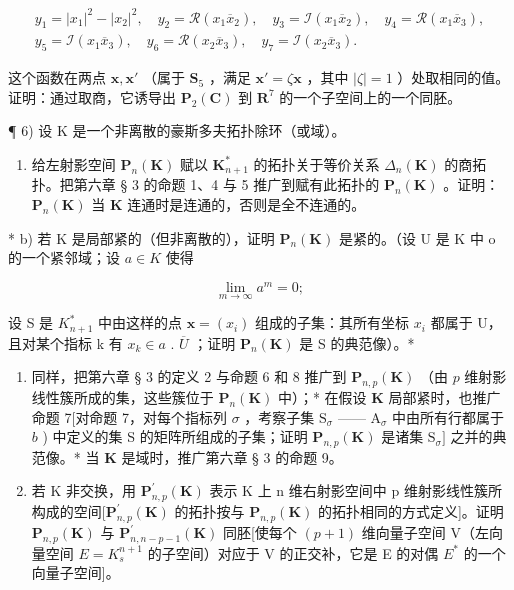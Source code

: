 \[
\begin{array}{c} y _ {1} = | x _ {1} | ^ {2} - | x _ {2} | ^ {2}, \quad y _ {2} = \mathcal {R} (x _ {1} \overline {{x}} _ {2}), \quad y _ {3} = \mathcal {I} (x _ {1} \overline {{x}} _ {2}), \quad y _ {4} = \mathcal {R} (x _ {1} \overline {{x}} _ {3}), \\ y _ {5} = \mathcal {I} (x _ {1} \overline {{x}} _ {3}), \quad y _ {6} = \mathcal {R} (x _ {2} \overline {{x}} _ {3}), \quad y _ {7} = \mathcal {I} (x _ {2} \overline {{x}} _ {3}). \end{array}
\]

这个函数在两点 \(\pmb{x}, \pmb{x}'\) （属于 \(\mathbf{S}_5\) ，满足 \(\pmb{x}' = \zeta \pmb{x}\) ，其中 \(|\zeta| = 1\) ）处取相同的值。证明：通过取商，它诱导出 \(\mathbf{P}_2(\mathbf{C})\) 到 \(\mathbf{R}^7\) 的一个子空间上的一个同胚。

¶ 6) 设 K 是一个非离散的豪斯多夫拓扑除环（或域）。

\begin{enumerate}
\def\labelenumi{\alph{enumi})}
\tightlist
\item
  给左射影空间 \(\mathbf{P}_n(\mathbf{K})\) 赋以 \(\mathbf{K}_{n+1}^*\) 的拓扑关于等价关系 \(\Delta_n(\mathbf{K})\) 的商拓扑。把第六章 § 3 的命题 1、4 与 5 推广到赋有此拓扑的 \(\mathbf{P}_n(\mathbf{K})\) 。证明：\(\mathbf{P}_n(\mathbf{K})\) 当 \(\mathbf{K}\) 连通时是连通的，否则是全不连通的。
\end{enumerate}

* b) 若 K 是局部紧的（但非离散的），证明 \(\mathbf{P}_{n}(\mathbf{K})\) 是紧的。（设 U 是 K 中 o 的一个紧邻域；设 \(a \in K\) 使得

\[
\lim _ {m \rightarrow \infty} a ^ {m} = 0;
\]

设 S 是 \(K_{n+1}^{*}\) 中由这样的点 \(\boldsymbol{x} = (x_{i})\) 组成的子集：其所有坐标 \(x_{i}\) 都属于 U，且对某个指标 k 有 \(x_{k} \in a\) . \(\overline{U}\) ；证明 \(\mathbf{P}_{n}(\mathbf{K})\) 是 S 的典范像）。*

\begin{enumerate}
\def\labelenumi{\alph{enumi})}
\setcounter{enumi}{2}
\item
  同样，把第六章 § 3 的定义 2 与命题 6 和 8 推广到 \(\mathbf{P}_{n,p}(\mathbf{K})\) （由 \(p\) 维射影线性簇所成的集，这些簇位于 \(\mathbf{P}_n(\mathbf{K})\) 中）；* 在假设 \(\mathbf{K}\) 局部紧时，也推广命题 7{[}对命题 7，对每个指标列 \(\sigma\) ，考察子集 \(\mathrm{S}_{\sigma}\) —— \(\mathrm{A}_{\sigma}\) 中由所有行都属于 \(b\) ) 中定义的集 S 的矩阵所组成的子集；证明 \(\mathbf{P}_{n,p}(\mathbf{K})\) 是诸集 \(\mathrm{S}_{\sigma}]\) 之并的典范像。* 当 \(\mathbf{K}\) 是域时，推广第六章 § 3 的命题 9。
\item
  若 K 非交换，用 \(\mathbf{P}_{n,p}^{\prime}(\mathbf{K})\) 表示 K 上 n 维右射影空间中 p 维射影线性簇所构成的空间{[}\(\mathbf{P}_{n,p}^{\prime}(\mathbf{K})\) 的拓扑按与 \(\mathbf{P}_{n,p}(\mathbf{K})\) 的拓扑相同的方式定义{]}。证明 \(\mathbf{P}_{n,p}(\mathbf{K})\) 与 \(\mathbf{P}_{n,n-p-1}^{\prime}(\mathbf{K})\) 同胚{[}使每个 \((p+1)\) 维向量子空间 V（左向量空间 \(E=K_{s}^{n+1}\) 的子空间）对应于 V 的正交补，它是 E 的对偶 \(E^{*}\) 的一个向量子空间{]}。
\end{enumerate}

